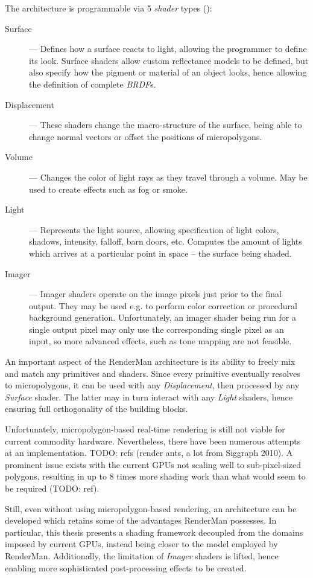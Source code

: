 The architecture is programmable via 5 \emph{shader} types (\cite{keyframeRSL1}):

\begin{description}
\item[Surface] --- Defines how a surface reacts to light, allowing the programmer to define its look. Surface shaders allow custom reflectance models to be defined, but also specify how the pigment or material of an object looks, hence allowing the definition of complete \emph{BRDF}s.
\item[Displacement] --- These shaders change the macro-structure of the surface, being able to change normal vectors or offset the positions of micropolygons.
\item[Volume] --- Changes the color of light rays as they travel through a volume. May be used to create effects such as fog or smoke.
\item[Light] --- Represents the light source, allowing specification of light colors, shadows, intensity, falloff, barn doors, etc. Computes the amount of lights which arrives at a particular point in space -- the surface being shaded.
\item[Imager] --- Imager shaders operate on the image pixels just prior to the final output. They may be used e.g. to perform color correction or procedural background generation. Unfortunately, an imager shader being run for a single output pixel may only use the corresponding single pixel as an input, so more advanced effects, such as tone mapping are not feasible.
\end{description}

An important aspect of the RenderMan architecture is its ability to freely mix and match any primitives and shaders. Since every primitive eventually resolves to micropolygons, it can be used with any \emph{Displacement}, then processed by any \emph{Surface} shader. The latter may in turn interact with any \emph{Light} shaders, hence ensuring full orthogonality of the building blocks.

Unfortunately, micropolygon-based real-time rendering is still not viable for current commodity hardware. Nevertheless, there have been numerous attempts at an implementation. TODO: refs (render ants, a lot from Siggraph 2010). A prominent issue exists with the current GPUs not scaling well to sub-pixel-sized polygons, resulting in up to 8 times more shading work than what would seem to be required (TODO: ref).

Still, even without using micropolygon-based rendering, an architecture can be developed which retains some of the advantages RenderMan possesses. In particular, this thesis presents a shading framework decoupled from the domains imposed by current GPUs, instead being closer to the model employed by RenderMan. Additionally, the limitation of \emph{Imager} shaders is lifted, hence enabling more sophisticated post-processing effects to be created.

